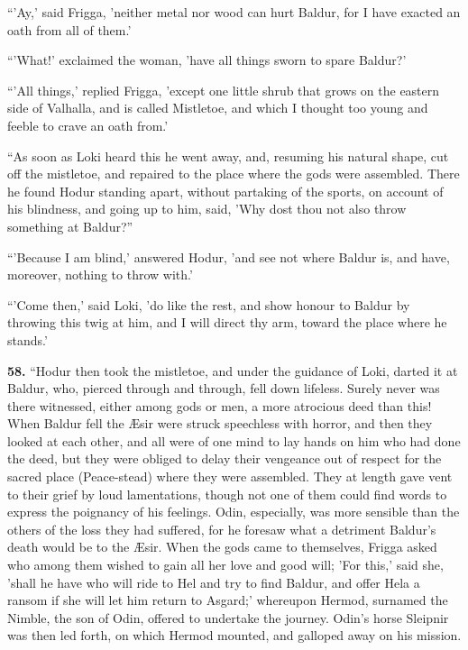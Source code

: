``'Ay,' said Frigga, 'neither metal nor wood can hurt Baldur, for I
have exacted an oath from all of them.'

``'What!' exclaimed the woman, 'have all things sworn to spare Baldur?'

``'All things,' replied Frigga, 'except one little shrub that grows on
the eastern side of Valhalla, and is called Mistletoe, and which I
thought too young and feeble to crave an oath from.'

``As soon as Loki heard this he went away, and, resuming his natural
shape, cut off the mistletoe, and repaired to the place where the gods
were assembled. There he found Hodur standing apart, without partaking
of the sports, on account of his blindness, and going up to him, said,
'Why dost thou not also throw something at Baldur?''

``'Because I am blind,' answered Hodur, 'and see not where Baldur is,
and have, moreover, nothing to throw with.'

``'Come then,' said Loki, 'do like the rest, and show honour to Baldur
by throwing this twig at him, and I will direct thy arm, toward the
place where he stands.'

\textbf{58.} ``Hodur then took the mistletoe, and under the guidance of Loki,
darted it at Baldur, who, pierced through and through, fell down
lifeless. Surely never was there witnessed, either among gods or men,
a more atrocious deed than this! When Baldur fell the Æsir were struck
speechless with horror, and then they looked at each other, and all
were of one mind to lay hands on him who had done the deed, but they
were obliged to delay their vengeance out of respect for the sacred
place (Peace-stead) where they were assembled. They at length gave
vent to their grief by loud lamentations, though not one of them could
find words to express the poignancy of his feelings. Odin, especially,
was more sensible than the others of the loss they had suffered, for
he foresaw what a detriment Baldur's death would be to the Æsir. When
the gods came to themselves, Frigga asked who among them wished to
gain all her love and good will; 'For this,' said she, 'shall he have
who will ride to Hel and try to find Baldur, and offer Hela a ransom
if she will let him return to Asgard;' whereupon Hermod, surnamed the
Nimble, the son of Odin, offered to undertake the journey. Odin's
horse Sleipnir was then led forth, on which Hermod mounted, and
galloped away on his mission.

